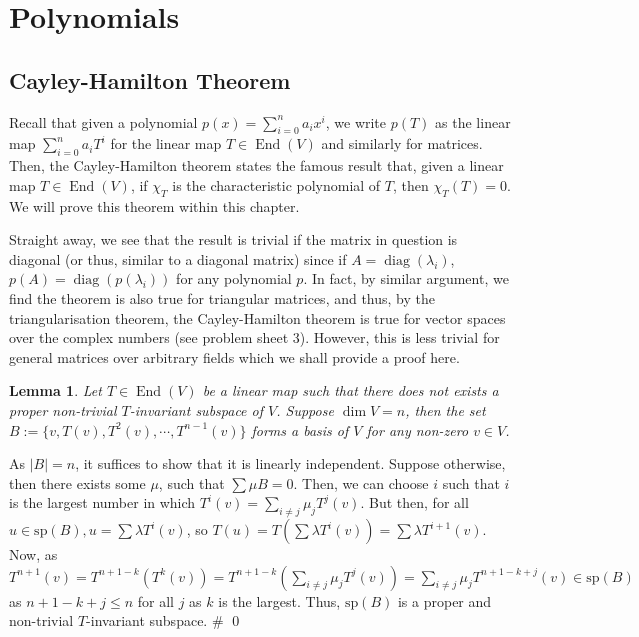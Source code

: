 \documentclass[
]{article}
\newtheorem{lemma}{Lemma}[section]
\theoremstyle{definition}
\begin{document}
\hypertarget{polynomials}{%
\section{Polynomials}\label{polynomials}}

\hypertarget{cayley-hamilton-theorem}{%
\subsection{Cayley-Hamilton Theorem}\label{cayley-hamilton-theorem}}

Recall that given a polynomial \(p(x) = \sum_{i = 0}^n a_i x^i\), we
write \(p(T)\) as the linear map \(\sum_{i = 0}^n a_i T^i\) for the
linear map \(T \in \mathop{\mathrm{End}}(V)\) and similarly for
matrices. Then, the Cayley-Hamilton theorem states the famous result
that, given a linear map \(T \in \mathop{\mathrm{End}}(V)\), if
\(\chi_T\) is the characteristic polynomial of \(T\), then
\(\chi_T(T) = 0\). We will prove this theorem within this chapter.

Straight away, we see that the result is trivial if the matrix in
question is diagonal (or thus, similar to a diagonal matrix) since if
\(A = \mathop{\mathrm{diag}}(\lambda_i)\),
\(p(A) = \mathop{\mathrm{diag}}(p(\lambda_i))\) for any polynomial
\(p\). In fact, by similar argument, we find the theorem is also true
for triangular matrices, and thus, by the triangularisation theorem, the
Cayley-Hamilton theorem is true for vector spaces over the complex
numbers (see problem sheet 3). However, this is less trivial for general
matrices over arbitrary fields which we shall provide a proof here.

\begin{lemma}\label{no_proper}
  Let \(T \in \mathop{\mathrm{End}}(V)\) be a linear map such that there does not exists a proper 
  non-trivial \(T\)-invariant subspace of \(V\). Suppose \(\dim V = n\), then 
  the set \(B := \{v, T(v), T^2(v), \cdots, T^{n - 1}(v)\}\) forms a basis of 
  \(V\) for any non-zero \(v \in V\). 
\end{lemma}
\proof

As \(\left| B \right| = n\), it suffices to show that it is linearly
independent. Suppose otherwise, then there exists some \(\mu\), such
that \(\sum \mu B = 0\). Then, we can choose \(i\) such that \(i\) is
the largest number in which \(T^i(v) = \sum_{i \neq j} \mu_j T^j(v)\).
But then, for all \(u \in \text{sp}(B), u = \sum \lambda T^i(v)\), so
\(T(u) =  T(\sum \lambda T^i(v)) = \sum \lambda T^{i + 1}(v)\). Now, as
\(T^{n + 1}(v)  = T^{n + 1 - k}(T^k(v)) = T^{n + 1 - k}(\sum_{i \neq j} \mu_j T^j(v))  = \sum_{i \neq j} \mu_j T^{n + 1 - k + j}(v) \in \text{sp}(B)\)
as \(n + 1 - k + j \le n\) for all \(j\) as \(k\) is the largest. Thus,
\(\text{sp}(B)\) is a proper and non-trivial \(T\)-invariant subspace.
\# \qed
\end{document}
